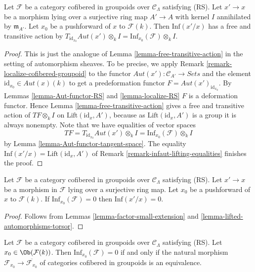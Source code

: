 \begin{lemma}
\label{lemma-lifted-automorphisms-torsor}
Let $\mathcal{F}$ be a category cofibered in groupoids over
$\mathcal{C}_\Lambda$ satisfying (RS). Let $x' \to x$ be a
morphism lying over a surjective ring map $A' \to A$ with kernel $I$
annihilated by $\mathfrak m_{A'}$. Let $x_0$ be a pushforward of $x$ to
$\mathcal{F}(k)$. Then $\text{Inf}(x'/x)$ has a free and transitive action by
$T_{\text{id}_{x_0}} \mathit{Aut}(x') \otimes_k I
= \text{Inf}_{x_0}(\mathcal{F}) \otimes_k I$.
\end{lemma}

\begin{proof}
This is just the analogue of
Lemma \ref{lemma-free-transitive-action}
in the setting of automorphism sheaves.
To be precise, we apply
Remark \ref{remark-localize-cofibered-groupoid}
to the functor $\mathit{Aut}(x') : \mathcal{C}_{A'} \to \textit{Sets}$
and the element $\text{id}_{x_0} \in \mathit{Aut}(x)(k)$ to get
a predeformation functor $F = \mathit{Aut}(x')_{\text{id}_{x_0}}$. By
Lemmas \ref{lemma-Aut-functor-RS} and \ref{lemma-localize-RS}
$F$ is a deformation functor. Hence
Lemma \ref{lemma-free-transitive-action}
gives a free and transitive action
of $TF \otimes_k I$ on $\text{Lift}(\text{id}_x, A')$, because as
$\text{Lift}(\text{id}_x, A')$ is a group it is always nonempty.
Note that we have equalities of vector spaces
$$
TF = T_{\text{id}_{x_0}} \mathit{Aut}(x') \otimes_k I =
\text{Inf}_{x_0}(\mathcal{F}) \otimes_k I
$$
by
Lemma \ref{lemma-Aut-functor-tangent-space}.
The equality $\text{Inf}(x'/x) = \text{Lift}(\text{id}_x, A')$ of
Remark \ref{remark-infaut-lifting-equalities}
finishes the proof.
\end{proof}

\begin{lemma}
\label{lemma-infaut-trivial}
Let $\mathcal{F}$ be a category cofibered in groupoids over
$\mathcal{C}_\Lambda$ satisfying (RS). Let $x' \to x$ be a morphism
in $\mathcal{F}$ lying over a surjective ring map. Let $x_0$ be a pushforward
of $x$ to $\mathcal{F}(k)$. If $\text{Inf}_{x_0}(\mathcal{F}) = 0$ then
$\text{Inf}(x'/x) = 0$.
\end{lemma}

\begin{proof}
Follows from
Lemmas \ref{lemma-factor-small-extension} and
\ref{lemma-lifted-automorphisms-torsor}.
\end{proof}

\begin{lemma}
\label{lemma-infdef-trivial}
Let $\mathcal{F}$ be a category cofibered in groupoids over
$\mathcal{C}_\Lambda$ satisfying (RS). Let
$x_0 \in \Ob(\mathcal{F}(k))$. Then $\text{Inf}_{x_0}(\mathcal{F}) = 0$
if and only if the natural morphism
$\mathcal{F}_{x_0} \to \overline{\mathcal{F}_{x_0}}$ of
categories cofibered in groupoids is an equivalence.
\end{lemma}

